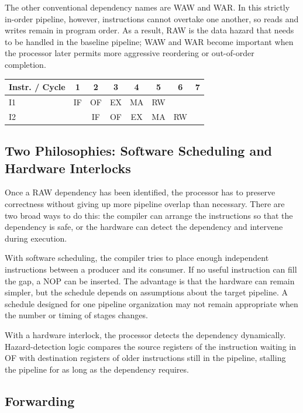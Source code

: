 \documentclass[12pt,a4paper]{report}
\begin{document}
The other conventional dependency names are WAW and WAR. In this strictly in-order pipeline, however, instructions cannot overtake one another, so reads and writes remain in program order. As a result, RAW is the data hazard that needs to be handled in the baseline pipeline; WAW and WAR become important when the processor later permits more aggressive reordering or out-of-order completion.~\cite{cornell-hazards}

\begin{center}
\begin{tabular}{lccccccc}
\toprule
Instr. / Cycle & 1 & 2 & 3 & 4 & 5 & 6 & 7 \\
\midrule
I1 & IF & OF & EX & MA & RW & & \\
I2 & & IF & OF & EX & MA & RW & \\
\bottomrule
\end{tabular}
\end{center}

\subsection{Two Philosophies: Software Scheduling and Hardware Interlocks}

Once a RAW dependency has been identified, the processor has to preserve correctness without giving up more pipeline overlap than necessary. There are two broad ways to do this: the compiler can arrange the instructions so that the dependency is safe, or the hardware can detect the dependency and intervene during execution.

With software scheduling, the compiler tries to place enough independent instructions between a producer and its consumer. If no useful instruction can fill the gap, a NOP can be inserted. The advantage is that the hardware can remain simpler, but the schedule depends on assumptions about the target pipeline. A schedule designed for one pipeline organization may not remain appropriate when the number or timing of stages changes.

With a hardware interlock, the processor detects the dependency dynamically. Hazard-detection logic compares the source registers of the instruction waiting in OF with destination registers of older instructions still in the pipeline, stalling the pipeline for as long as the dependency requires.

\subsection{Forwarding}
\label{sec:forwarding}
\end{document}
